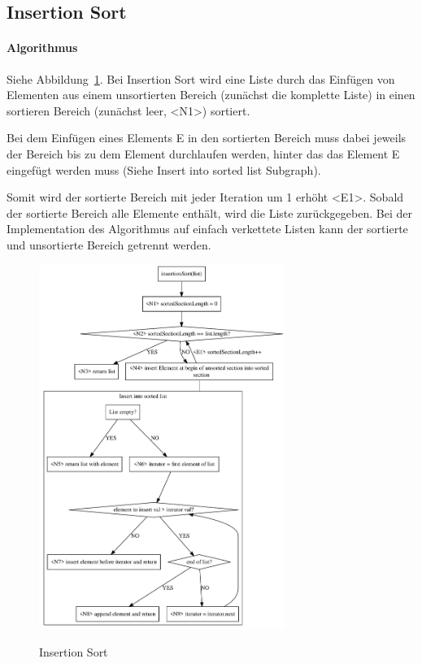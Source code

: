 \subsection{Insertion Sort}\label{subsec:insertion-sort}

\paragraph{Algorithmus}\label{subsec:Ialgorithmus}
Siehe Abbildung~\ref{fig:insertionS}.
Bei Insertion Sort wird eine Liste durch das Einfügen von Elementen aus
einem unsortierten Bereich (zunächst die komplette Liste) in einen sortieren
Bereich (zunächst leer, <N1>) sortiert.

Bei dem Einfügen eines Elements E in den sortierten Bereich muss dabei
jeweils der Bereich bis zu dem Element durchlaufen werden, hinter das das
Element E eingefügt werden muss (Siehe \frqq Insert into sorted list\flqq
Subgraph).

Somit wird der sortierte Bereich mit jeder Iteration um 1 erhöht <E1>.
Sobald der sortierte Bereich alle Elemente enthält, wird die Liste
zurückgegeben.
Bei der Implementation des Algorithmus auf einfach verkettete Listen
kann der sortierte und unsortierte Bereich getrennt werden.


\begin{figure}[hbt]
    \caption{Insertion Sort}
    \centering
    \includegraphics[width = 8cm]{insertionS}\label{fig:insertionS}
\end{figure}
\FloatBarrier

